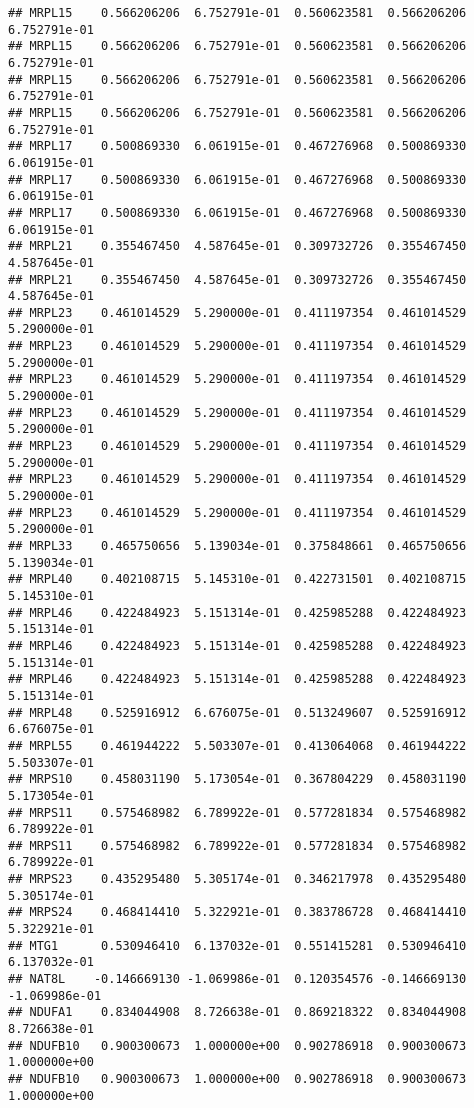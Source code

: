 \documentclass[
]{article}
\begin{document}
\begin{verbatim}
## MRPL15    0.566206206  6.752791e-01  0.560623581  0.566206206  6.752791e-01
## MRPL15    0.566206206  6.752791e-01  0.560623581  0.566206206  6.752791e-01
## MRPL15    0.566206206  6.752791e-01  0.560623581  0.566206206  6.752791e-01
## MRPL15    0.566206206  6.752791e-01  0.560623581  0.566206206  6.752791e-01
## MRPL17    0.500869330  6.061915e-01  0.467276968  0.500869330  6.061915e-01
## MRPL17    0.500869330  6.061915e-01  0.467276968  0.500869330  6.061915e-01
## MRPL17    0.500869330  6.061915e-01  0.467276968  0.500869330  6.061915e-01
## MRPL21    0.355467450  4.587645e-01  0.309732726  0.355467450  4.587645e-01
## MRPL21    0.355467450  4.587645e-01  0.309732726  0.355467450  4.587645e-01
## MRPL23    0.461014529  5.290000e-01  0.411197354  0.461014529  5.290000e-01
## MRPL23    0.461014529  5.290000e-01  0.411197354  0.461014529  5.290000e-01
## MRPL23    0.461014529  5.290000e-01  0.411197354  0.461014529  5.290000e-01
## MRPL23    0.461014529  5.290000e-01  0.411197354  0.461014529  5.290000e-01
## MRPL23    0.461014529  5.290000e-01  0.411197354  0.461014529  5.290000e-01
## MRPL23    0.461014529  5.290000e-01  0.411197354  0.461014529  5.290000e-01
## MRPL23    0.461014529  5.290000e-01  0.411197354  0.461014529  5.290000e-01
## MRPL33    0.465750656  5.139034e-01  0.375848661  0.465750656  5.139034e-01
## MRPL40    0.402108715  5.145310e-01  0.422731501  0.402108715  5.145310e-01
## MRPL46    0.422484923  5.151314e-01  0.425985288  0.422484923  5.151314e-01
## MRPL46    0.422484923  5.151314e-01  0.425985288  0.422484923  5.151314e-01
## MRPL46    0.422484923  5.151314e-01  0.425985288  0.422484923  5.151314e-01
## MRPL48    0.525916912  6.676075e-01  0.513249607  0.525916912  6.676075e-01
## MRPL55    0.461944222  5.503307e-01  0.413064068  0.461944222  5.503307e-01
## MRPS10    0.458031190  5.173054e-01  0.367804229  0.458031190  5.173054e-01
## MRPS11    0.575468982  6.789922e-01  0.577281834  0.575468982  6.789922e-01
## MRPS11    0.575468982  6.789922e-01  0.577281834  0.575468982  6.789922e-01
## MRPS23    0.435295480  5.305174e-01  0.346217978  0.435295480  5.305174e-01
## MRPS24    0.468414410  5.322921e-01  0.383786728  0.468414410  5.322921e-01
## MTG1      0.530946410  6.137032e-01  0.551415281  0.530946410  6.137032e-01
## NAT8L    -0.146669130 -1.069986e-01  0.120354576 -0.146669130 -1.069986e-01
## NDUFA1    0.834044908  8.726638e-01  0.869218322  0.834044908  8.726638e-01
## NDUFB10   0.900300673  1.000000e+00  0.902786918  0.900300673  1.000000e+00
## NDUFB10   0.900300673  1.000000e+00  0.902786918  0.900300673  1.000000e+00

\end{verbatim}
\end{document}
